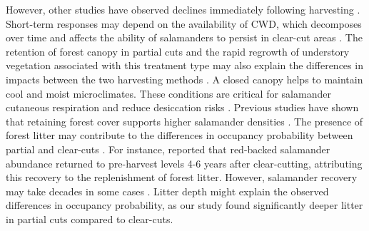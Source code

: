 However, other studies have observed declines immediately following harvesting \citep{deMaynadier1995relationshipforest,Macneil2014Effectstimber}. 
Short-term responses may depend on the availability of CWD, which decomposes over time and affects the ability of salamanders to persist in clear-cut areas \citep{Ochs2022Responseterrestrial}. 
The retention of forest canopy in partial cuts and the rapid regrowth of understory vegetation associated with this treatment type may also explain the differences in impacts between the two harvesting methods \citep{Raybuck2015silviculturalpractices}. 
A closed canopy helps to maintain cool and moist microclimates. 
These conditions are critical for salamander cutaneous respiration and reduce desiccation risks \citep{Homyack2011Energeticssurface}. 
Previous studies have shown that retaining forest cover supports higher salamander densities \citep{Hocking2013Effectsexperimental,Harper2015Impactforestry,Mahoney2016Woodlandsalamander}. 
The presence of forest litter may contribute to the differences in occupancy probability between partial and clear-cuts \citep{tilghmanMetaanalysisEffectsCanopy2012}. 
For instance, \cite{Ash1997DisappearanceReturn} reported that red-backed salamander abundance returned to pre-harvest levels 4-6 years after clear-cutting, attributing this recovery to the replenishment of forest litter. 
However, salamander recovery may take decades in some cases \citep{Homyack2013Effectsrepeatedstand,Ochs2022Responseterrestrial}. 
Litter depth might explain the observed differences in occupancy probability, as our study found significantly deeper litter in partial cuts compared to clear-cuts. 

